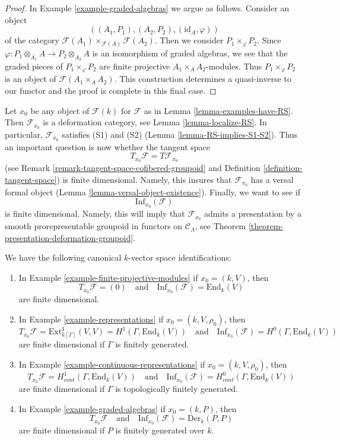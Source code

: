 \begin{proof}
\medskip\noindent
In Example \ref{example-graded-algebras} we argue as follows.
Consider an object
$$
((A_1, P_1), (A_2, P_2), (\text{id}_A, \varphi))
$$
of the category $\mathcal{F}(A_1) \times_{\mathcal{F}(A)} \mathcal{F}(A_2)$.
Then we consider $P_1 \times_\varphi P_2$. Since
$\varphi : P_1 \otimes_{A_1} A \to P_2 \otimes_{A_2} A$
is an isomorphism of graded algebras, we see that the graded pieces
of $P_1 \times_\varphi P_2$ are finite projective $A_1 \times_A A_2$-modules.
Thus $P_1 \times_\varphi P_2$ is an object of $\mathcal{F}(A_1 \times_A A_2)$.
This construction determines a quasi-inverse to our functor
and the proof is complete in this final case.
\end{proof}

\noindent
Let $x_0$ be any object of $\mathcal{F}(k)$ for $\mathcal{F}$ as in
Lemma \ref{lemma-examples-have-RS}. Then $\mathcal{F}_{x_0}$ is
a deformation category, see Lemma \ref{lemma-localize-RS}.
In particular, $\mathcal{F}_{x_0}$ satisfies (S1) and (S2)
(Lemma \ref{lemma-RS-implies-S1-S2}). Thus an important question
is now whether the tangent space
$$
T_{x_0}\mathcal{F} = T\mathcal{F}_{x_0}
$$
(see Remark \ref{remark-tangent-space-cofibered-groupoid} and
Definition \ref{definition-tangent-space})
is finite dimensional. Namely, this insures that
$\mathcal{F}_{x_0}$ has a versal formal object
(Lemma \ref{lemma-versal-object-existence}).
Finally, we want to see if
$$
\text{Inf}_{x_0}(\mathcal{F})
$$
is finite dimensional. Namely, this will imply that
$\mathcal{F}_{x_0}$ admits a presentation by a
smooth prorepresentable groupoid in functors on $\mathcal{C}_\Lambda$, see
Theorem \ref{theorem-presentation-deformation-groupoid}.

\begin{lemma}
\label{lemma-tangent-and-inf}
We have the following canonical $k$-vector space identifications:
\begin{enumerate}
\item In Example \ref{example-finite-projective-modules}
if $x_0 = (k, V)$, then
$$
T_{x_0}\mathcal{F} = (0)
\quad\text{and}\quad
\text{Inf}_{x_0}(\mathcal{F}) = \text{End}_k(V)
$$
are finite dimensional.
\item In Example \ref{example-representations}
if $x_0 = (k, V, \rho_0)$, then
$$
T_{x_0}\mathcal{F} = \text{Ext}^1_{k[\Gamma]}(V, V) =
H^1(\Gamma, \text{End}_k(V))
\quad\text{and}\quad
\text{Inf}_{x_0}(\mathcal{F}) = H^0(\Gamma, \text{End}_k(V))
$$
are finite dimensional if $\Gamma$ is finitely generated.
\item In Example \ref{example-continuous-representations}
if $x_0 = (k, V, \rho_0)$, then
$$
T_{x_0}\mathcal{F} = H^1_{cont}(\Gamma, \text{End}_k(V))
\quad\text{and}\quad
\text{Inf}_{x_0}(\mathcal{F}) = H^0_{cont}(\Gamma, \text{End}_k(V))
$$
are finite dimensional if $\Gamma$ is topologically finitely generated.
\item In Example \ref{example-graded-algebras}
if $x_0 = (k, P)$, then
$$
T_{x_0}\mathcal{F}
\quad\text{and}\quad
\text{Inf}_{x_0}(\mathcal{F}) = \text{Der}_k(P, P)
$$
are finite dimensional if $P$ is finitely generated over $k$.
\end{enumerate}
\end{lemma}

